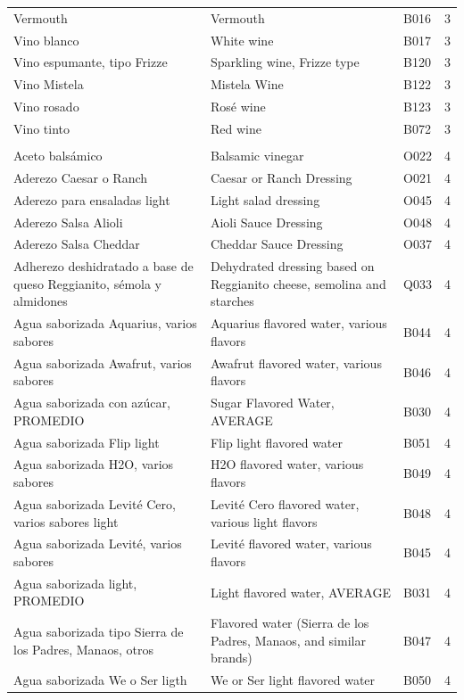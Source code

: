 {\begin{longtable}{p{4.3cm}p{5.5cm}p{1.5cm}p{0.7cm}}
Vermouth & Vermouth & B016 & 3\\
Vino blanco & White wine & B017 & 3\\
Vino espumante, tipo Frizze & Sparkling wine, Frizze type & B120 & 3\\
Vino Mistela & Mistela Wine & B122 & 3\\
Vino rosado & Rosé wine & B123 & 3\\
Vino tinto & Red wine & B072 & 3\\
\addlinespace
\multicolumn{4}{l}{\textbf{NOVA 4. Ultra-processed foods}}\\
Aceto balsámico & Balsamic vinegar & O022 & 4\\
Aderezo Caesar o Ranch & Caesar or Ranch Dressing & O021 & 4\\
Aderezo para ensaladas light & Light salad dressing & O045 & 4\\
Aderezo Salsa Alioli & Aioli Sauce Dressing & O048 & 4\\
Aderezo Salsa Cheddar & Cheddar Sauce Dressing & O037 & 4\\
Adherezo deshidratado a base de queso Reggianito, sémola y almidones & Dehydrated dressing based on Reggianito cheese, semolina and starches & Q033 & 4\\
Agua saborizada Aquarius, varios sabores & Aquarius flavored water, various flavors & B044 & 4\\
Agua saborizada Awafrut, varios sabores & Awafrut flavored water, various flavors & B046 & 4\\
Agua saborizada con azúcar, PROMEDIO & Sugar Flavored Water, AVERAGE & B030 & 4\\
Agua saborizada Flip light & Flip light flavored water & B051 & 4\\
Agua saborizada H2O, varios sabores & H2O flavored water, various flavors & B049 & 4\\
Agua saborizada Levité Cero, varios sabores light & Levité Cero flavored water, various light flavors & B048 & 4\\
Agua saborizada Levité, varios sabores & Levité flavored water, various flavors & B045 & 4\\
Agua saborizada light, PROMEDIO & Light flavored water, AVERAGE & B031 & 4\\
Agua saborizada tipo Sierra de los Padres, Manaos, otros & Flavored water (Sierra de los Padres, Manaos, and similar brands) & B047 & 4\\
Agua saborizada We o Ser ligth & We or Ser light flavored water & B050 & 4\\

\end{longtable}}
